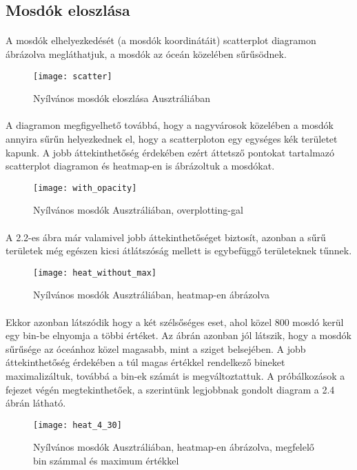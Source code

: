 	\subsection{Mosdók eloszlása}
	\paragraph{}
	A mosdók elhelyezkedését (a mosdók koordinátáit) scatterplot diagramon ábrázolva megláthatjuk, a mosdók az óceán közelében sűrűsödnek.
	\begin{figure}[!ht]
		\centering
			\texttt{[image: scatter]}
			\caption{Nyílvános mosdók eloszlása Ausztráliában}
	\end{figure}
	\paragraph{}
	A diagramon megfigyelhető továbbá, hogy a nagyvárosok közelében a mosdók annyira sűrűn helyezkednek el, hogy a scatterploton egy egységes kék területet kapunk. A jobb áttekinthetőség érdekében ezért áttetsző pontokat tartalmazó scatterplot diagramon és heatmap-en is ábrázoltuk a mosdókat.
	\begin{figure}[!ht]
		\centering	
			\texttt{[image: with\_opacity]}
			\caption{Nyílvános mosdók Ausztráliában, overplotting-gal}
	\end{figure}
	\paragraph{}
	A 2.2-es ábra már valamivel jobb áttekinthetőséget biztosít, azonban a sűrű területek még egészen kicsi átlátszóság mellett is egybefüggő területeknek tűnnek.
	\begin{figure}[!ht]
		\centering	
			\texttt{[image: heat\_without\_max]}
			\caption{Nyílvános mosdók Ausztráliában, heatmap-en ábrázolva}
	\end{figure}
	\paragraph{}
	Ekkor azonban látszódik hogy a két szélsőséges eset, ahol közel 800 mosdó kerül egy bin-be elnyomja a többi értéket. Az ábrán azonban jól látszik, hogy a mosdók sűrűsége az óceánhoz közel magasabb, mint a sziget belsejében. A jobb áttekinthetőség érdekében a túl magas értékkel rendelkező bineket maximalizáltuk, továbbá a bin-ek számát is megváltoztattuk. A próbálkozások a fejezet végén megtekinthetőek, a szerintünk legjobbnak gondolt diagram a 2.4 ábrán látható.	
	\begin{figure}[!ht]
		\centering	
			\texttt{[image: heat\_4\_30]}
			\caption{Nyílvános mosdók Ausztráliában, heatmap-en ábrázolva, megfelelő bin számmal és maximum értékkel}
	\end{figure}
	\clearpage
